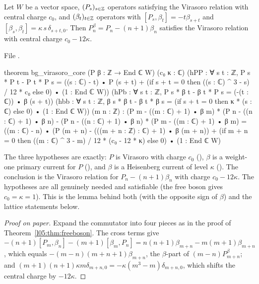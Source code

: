 \begin{theorem}\label{l05:thm:bgcore}
Let $W$ be a vector space, $(P_s)_{s\in{\mathbb{Z}}}$ operators satisfying the Virasoro relation with central charge $c_0$, and
$(\beta_t)_{t\in{\mathbb{Z}}}$ operators with $[P_s,\beta_t]=-t\beta_{s+t}$ and $[\beta_s,\beta_t]=\kappa\,s\,\delta_{s+t,0}$. Then
$P^\beta_n=P_n-(n+1)\beta_n$ satisfies the Virasoro relation with central charge $c_0-12\kappa$.
\end{theorem}

\noindent File .
\begin{leancode}
theorem bg_virasoro_core (P β : ℤ → End ℂ W) (c₀ κ : ℂ)
    (hPP : ∀ s t : ℤ, P s * P t - P t * P s
      = ((s : ℂ) - t) • P (s + t)
        + (if s + t = 0 then ((s : ℂ) ^ 3 - s) / 12 * c₀ else 0) • (1 : End ℂ W))
    (hPb : ∀ s t : ℤ, P s * β t - β t * P s = (-(t : ℂ)) • β (s + t))
    (hbb : ∀ s t : ℤ, β s * β t - β t * β s
      = (if s + t = 0 then κ * (s : ℂ) else 0) • (1 : End ℂ W))
    (m n : ℤ) :
    (P m - ((m : ℂ) + 1) • β m) * (P n - ((n : ℂ) + 1) • β n)
      - (P n - ((n : ℂ) + 1) • β n) * (P m - ((m : ℂ) + 1) • β m)
      = ((m : ℂ) - n) • (P (m + n) - (((m + n : ℤ) : ℂ) + 1) • β (m + n))
        + (if m + n = 0 then ((m : ℂ) ^ 3 - m) / 12 * (c₀ - 12 * κ) else 0) • (1 : End ℂ W)
\end{leancode}

\begin{dictionary}
The three hypotheses are exactly: $P$ is Virasoro with charge $c_0$ (), $\beta$ is a weight-one primary current
for $P$ (), and $\beta$ is a Heisenberg current of level $\kappa$ (). The conclusion is the
Virasoro relation for $P_n-(n+1)\beta_n$ with charge $c_0-12\kappa$. The hypotheses are all genuinely needed and
satisfiable (the free boson gives $c_0=\kappa=1$). This is the lemma behind both  (with the opposite
sign of $\beta$) and the lattice statements below.
\end{dictionary}

\begin{proof}[Proof on paper]
Expand the commutator into four pieces as in the proof of Theorem~\ref{l05:thm:freeboson}. The cross terms give
$-(n+1)[P_m,\beta_n]-(m+1)[\beta_m,P_n]=n(n+1)\beta_{m+n}-m(m+1)\beta_{m+n}$, which equals $-(m-n)(m+n+1)\beta_{m+n}$, the $\beta$-part of
$(m-n)P^\beta_{m+n}$; and $(m+1)(n+1)\kappa m\delta_{m+n,0}=-\kappa(m^3-m)\delta_{m+n,0}$, which shifts the central
charge by $-12\kappa$.
\end{proof}

